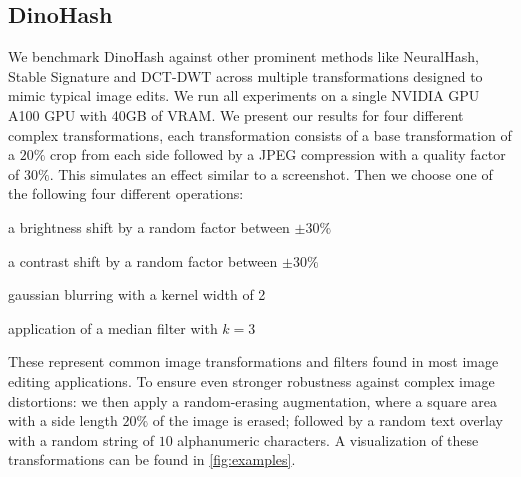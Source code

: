 \subsection{DinoHash}
We benchmark DinoHash against other prominent methods like NeuralHash, Stable Signature and DCT-DWT across multiple transformations designed to mimic typical image edits. We run all experiments on a single NVIDIA GPU A100 GPU with 40GB of VRAM. We present our results for four different complex transformations, each transformation consists of a base transformation of a $20\%$ crop from each side followed by a JPEG compression with a quality factor of $30\%$. This simulates an effect similar to a screenshot. Then we choose one of the following four different operations: 

\begin{compactenum}
    \item a brightness shift by a random factor between $\pm 30\%$
    \item a contrast shift by a random factor between $\pm 30\%$
    \item gaussian blurring with a kernel width of 2
    \item application of a median filter with $k=3$
\end{compactenum}
\noindent These represent common image transformations and filters found in most image editing applications. To ensure even stronger robustness against complex image distortions: we then apply a random-erasing augmentation, where a square area with a side length $20\%$ of the image is erased; followed by a random text overlay with a random string of $10$ alphanumeric characters. A visualization of these transformations can be found in \autoref{fig:examples}.



